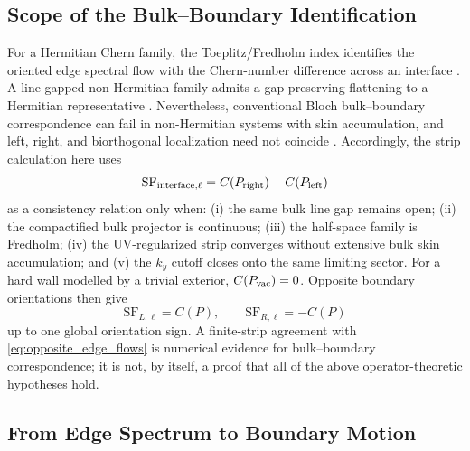 \documentclass[11pt]{article}
\numberwithin{equation}{section}
\begin{document}
\subsection{Scope of the Bulk--Boundary Identification}

For a Hermitian Chern family, the Toeplitz/Fredholm index identifies the
oriented edge spectral flow with the Chern-number difference across an
interface \cite{Kellendonk2002,GrafPorta2013,ProdanSchulzBaldes2016}.
A line-gapped non-Hermitian family admits a gap-preserving flattening to a
Hermitian representative \cite{Kawabata2019}.  Nevertheless, conventional
Bloch bulk--boundary correspondence can fail in non-Hermitian systems with
skin accumulation, and left, right, and biorthogonal localization need not
coincide \cite{Kunst2018,YaoWang2018}.  Accordingly, the strip calculation
here uses
\begin{equation}
  \mathrm{SF}_{\rm interface,\ell}
  =C(P_{\rm right})-C(P_{\rm left})
  \label{eq:bulk_boundary}
\end{equation}
as a consistency relation only when: (i) the same bulk line gap remains
open; (ii) the compactified bulk projector is continuous; (iii) the
half-space family is Fredholm; (iv) the UV-regularized strip converges
without extensive bulk skin accumulation; and (v) the $k_y$ cutoff closes
onto the same limiting sector.  For a hard wall modelled by a trivial
exterior, $C(P_{\rm vac})=0$.  Opposite boundary orientations then give
\begin{equation}
  \mathrm{SF}_{L,\ell}=C(P),
  \qquad
  \mathrm{SF}_{R,\ell}=-C(P)
  \label{eq:opposite_edge_flows}
\end{equation}
up to one global orientation sign.  A finite-strip agreement with
\eqref{eq:opposite_edge_flows} is numerical evidence for bulk--boundary
correspondence; it is not, by itself, a proof that all of the above
operator-theoretic hypotheses hold.

\subsection{From Edge Spectrum to Boundary Motion}
\end{document}
